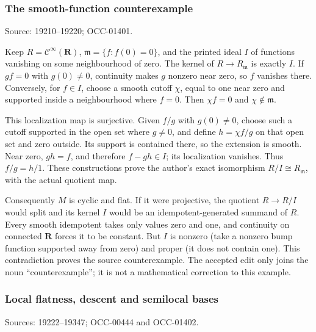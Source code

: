 \subsubsection{The smooth-function counterexample}\label{algebra-proof-009-the-smooth-function-counterexample}

Source: 19210--19220; OCC-01401.

Keep \(R=\mathcal C^\infty(\mathbf R)\), \(\mathfrak m=\{f:f(0)=0\}\), and the printed ideal \(I\) of functions vanishing on some neighbourhood of zero. The kernel of \(R\to R_{\mathfrak m}\) is exactly \(I\). If \(gf=0\) with \(g(0)\ne0\), continuity makes \(g\) nonzero near zero, so \(f\) vanishes there. Conversely, for \(f\in I\), choose a smooth cutoff \(\chi\), equal to one near zero and supported inside a neighbourhood where \(f=0\). Then \(\chi f=0\) and \(\chi\notin\mathfrak m\).

This localization map is surjective. Given \(f/g\) with \(g(0)\ne0\), choose such a cutoff supported in the open set where \(g\ne0\), and define \(h=\chi f/g\) on that open set and zero outside. Its support is contained there, so the extension is smooth. Near zero, \(gh=f\), and therefore \(f-gh\in I\); its localization vanishes. Thus \(f/g=h/1\). These constructions prove the author's exact isomorphism \(R/I\cong R_{\mathfrak m}\), with the actual quotient map.

Consequently \(M\) is cyclic and flat. If it were projective, the quotient \(R\to R/I\) would split and its kernel \(I\) would be an idempotent-generated summand of \(R\). Every smooth idempotent takes only values zero and one, and continuity on connected \(\mathbf R\) forces it to be constant. But \(I\) is nonzero (take a nonzero bump function supported away from zero) and proper (it does not contain one). This contradiction proves the source counterexample. The accepted edit only joins the noun ``counterexample''; it is not a mathematical correction to this example.

\subsubsection{Local flatness, descent and semilocal bases}\label{algebra-proof-009-local-flatness-descent-and-semilocal-bases}

Sources: 19222--19347; OCC-00444 and OCC-01402.

